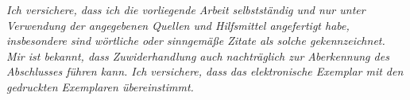 \vspace*{\fill}
\noindent

\textit{Ich versichere, dass ich die vorliegende Arbeit selbstständig und nur unter Verwendung der angegebenen Quellen und Hilfsmittel angefertigt habe, insbesondere sind wörtliche oder sinngemäße Zitate als solche gekennzeichnet. Mir ist bekannt, dass Zuwiderhandlung auch nachträglich zur Aberkennung des Abschlusses führen kann. Ich versichere, dass das elektronische Exemplar mit den gedruckten Exemplaren übereinstimmt.}


\vspace*{\fill}
